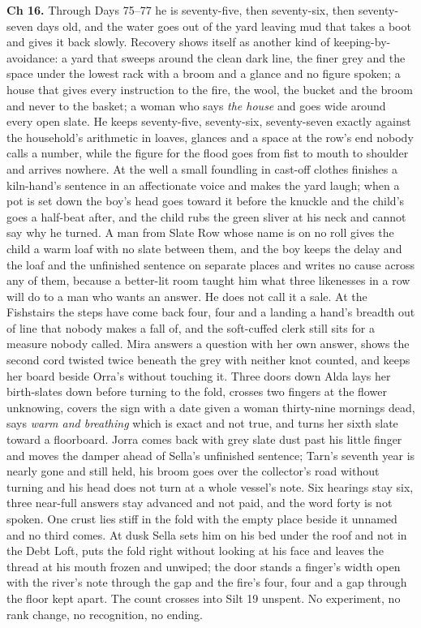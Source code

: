 \documentclass{design/chronicle}
\begin{document}
{\textbf{Ch 16.} Through Days 75–77 he is seventy-five, then seventy-six, then seventy-seven days old, and the water goes out of the yard leaving mud that takes a boot and gives it back slowly. Recovery shows itself as another kind of keeping-by-avoidance: a yard that sweeps around the clean dark line, the finer grey and the space under the lowest rack with a broom and a glance and no figure spoken; a house that gives every instruction to the fire, the wool, the bucket and the broom and never to the basket; a woman who says \emph{the house} and goes wide around every open slate. He keeps seventy-five, seventy-six, seventy-seven exactly against the household’s arithmetic in loaves, glances and a space at the row’s end nobody calls a number, while the figure for the flood goes from fist to mouth to shoulder and arrives nowhere. At the well a small foundling in cast-off clothes finishes a kiln-hand’s sentence in an affectionate voice and makes the yard laugh; when a pot is set down the boy’s head goes toward it before the knuckle and the child’s goes a half-beat after, and the child rubs the green sliver at his neck and cannot say why he turned. A man from Slate Row whose name is on no roll gives the child a warm loaf with no slate between them, and the boy keeps the delay and the loaf and the unfinished sentence on separate places and writes no cause across any of them, because a better-lit room taught him what three likenesses in a row will do to a man who wants an answer. He does not call it a sale. At the Fishstairs the steps have come back four, four and a landing a hand’s breadth out of line that nobody makes a fall of, and the soft-cuffed clerk still sits for a measure nobody called. Mira answers a question with her own answer, shows the second cord twisted twice beneath the grey with neither knot counted, and keeps her board beside Orra’s without touching it. Three doors down Alda lays her birth-slates down before turning to the fold, crosses two fingers at the flower unknowing, covers the sign with a date given a woman thirty-nine mornings dead, says \emph{warm and breathing} which is exact and not true, and turns her sixth slate toward a floorboard. Jorra comes back with grey slate dust past his little finger and moves the damper ahead of Sella’s unfinished sentence; Tarn’s seventh year is nearly gone and still held, his broom goes over the collector’s road without turning and his head does not turn at a whole vessel’s note. Six hearings stay six, three near-full answers stay advanced and not paid, and the word forty is not spoken. One crust lies stiff in the fold with the empty place beside it unnamed and no third comes. At dusk Sella sets him on his bed under the roof and not in the Debt Loft, puts the fold right without looking at his face and leaves the thread at his mouth frozen and unwiped; the door stands a finger’s width open with the river’s note through the gap and the fire’s four, four and a gap through the floor kept apart. The count crosses into Silt 19 unspent. No experiment, no rank change, no recognition, no ending.

}
\end{document}
